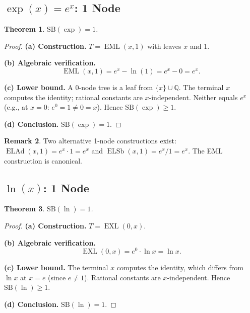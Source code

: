 \documentclass[12pt,a4paper]{article}
\newtheorem{theorem}{Theorem}[section]
\theoremstyle{definition}
\newtheorem{remark}[theorem]{Remark}
\newcommand{\EML}{\operatorname{EML}}
\newcommand{\EXL}{\operatorname{EXL}}
\newcommand{\ELAd}{\operatorname{ELAd}}
\newcommand{\ELSb}{\operatorname{ELSb}}
\newcommand{\SB}{\mathrm{SB}}
\begin{document}
\subsection{\texorpdfstring{$\exp(x) = e^x$}{exp(x)}: 1 Node}
\label{sec:exp}

\begin{theorem}
\label{thm:exp}
$\SB(\exp) = 1$.
\end{theorem}

\begin{proof}
\textbf{(a) Construction.}
$T = \EML(x,1)$ with leaves $x$ and $1$.

\textbf{(b) Algebraic verification.}
\[
  \EML(x,1) = e^x - \ln(1) = e^x - 0 = e^x.
\]

\textbf{(c) Lower bound.}
A 0-node tree is a leaf from $\{x\}\cup\mathbb{Q}$.
The terminal $x$ computes the identity; rational constants are $x$-independent.
Neither equals $e^x$ (e.g., at $x=0$: $e^0 = 1 \ne 0 = x$).
Hence $\SB(\exp) \ge 1$.

\textbf{(d) Conclusion.} $\SB(\exp) = 1$.
\end{proof}

\begin{remark}
Two alternative 1-node constructions exist:
$\ELAd(x,1) = e^x \cdot 1 = e^x$ and $\ELSb(x,1) = e^x/1 = e^x$.
The EML construction is canonical.
\end{remark}

\subsection{\texorpdfstring{$\ln(x)$}{ln(x)}: 1 Node}
\label{sec:ln}

\begin{theorem}
\label{thm:ln}
$\SB(\ln) = 1$.
\end{theorem}

\begin{proof}
\textbf{(a) Construction.}
$T = \EXL(0,x)$.

\textbf{(b) Algebraic verification.}
\[
  \EXL(0,x) = e^0 \cdot \ln x = \ln x.
\]

\textbf{(c) Lower bound.}
The terminal $x$ computes the identity, which differs from $\ln x$ at $x = e$
(since $e \ne 1$).  Rational constants are $x$-independent.
Hence $\SB(\ln) \ge 1$.

\textbf{(d) Conclusion.} $\SB(\ln) = 1$.
\end{proof}
\end{document}
